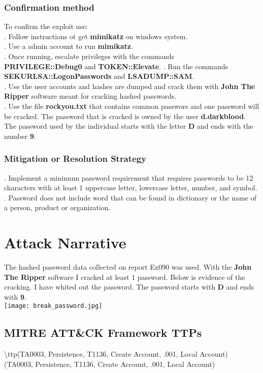 \documentclass[notitlepage]{article}
\begin{document}
	\subsubsection{Confirmation method}
	To confirm the exploit use: \\
	. Follow instructions ot get \textbf{mimikatz} on windows system.\\
	. Use a admin account to run \textbf{mimikatz}.\\
	. Once running, escalate privileges with the commands \\ \textbf{PRIVILEGE::Debug0} and \textbf{TOKEN::Elevate}.
	. Run the commands \textbf{SEKURLSA::LogonPasswords} and  \textbf{LSADUMP::SAM}.\\
	. Use the user accounts and hashes are dumped and crack them with \textbf{John The Ripper} software meant for cracking hashed passwords.  \\
	. Use the file \textbf{rockyou.txt} that contains common passwors and one password will be cracked. The password that is cracked is owned by the user \textbf{d.darkblood}. The password used by the individual starts with the letter \textbf{D} and ends with the number \textbf{9}.  \\
	
	\subsubsection{Mitigation or Resolution Strategy}
	\indent {}. Implement a minimum password requirement that requires passwords to be 12 characters with at least 1 uppercase letter, lowercase letter, number, and symbol.  \\
	. Password does not include word that can be found in dictionary or the name of a person, product or organization.  \\
	
	\section{Attack Narrative}
	
	\indent The hashed password data collected on report Ex090 was used.  With the \textbf{John The Ripper} software I cracked at least 1 password. Below is evidence of the cracking.  I have whited out the password. The password starts with \textbf{D} and ends with \textbf{9}.  \\
	\texttt{[image: break\_password.jpg]} \\

	
	\subsection{MITRE ATT{\&}CK Framework TTPs}
	
	\indent\textbackslash ttp(TA0003, Persistence, T1136, Create Account, .001, Local Account) \\
	\ttp(TA0003, Persistence, T1136, Create Account, .001, Local Account) \\
	
\end{document}
